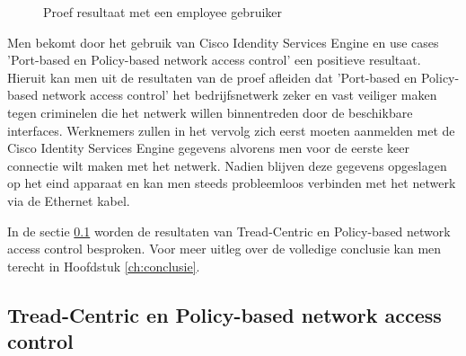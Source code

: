 \begin{figure}[H]
	\centering
	\qquad
	\newline
	\qquad
	\caption{Proef resultaat met een employee gebruiker}%
	\label{fig:Test_gebruiker}%
\end{figure}

Men bekomt door het gebruik van Cisco Idendity Services Engine en use cases 'Port-based en Policy-based network access control' een positieve resultaat. Hieruit kan men uit de resultaten van de proef afleiden dat 'Port-based en Policy-based network access control' het bedrijfsnetwerk zeker en vast veiliger maken tegen criminelen die het netwerk willen binnentreden door de beschikbare interfaces. Werknemers zullen in het vervolg zich eerst moeten aanmelden met de Cisco Identity Services Engine gegevens alvorens men voor de eerste keer connectie wilt maken met het netwerk. Nadien blijven deze gegevens opgeslagen op het eind apparaat en kan men steeds probleemloos verbinden met het netwerk via de Ethernet kabel.

In de sectie \ref{sec:trepo} worden de resultaten van Tread-Centric en Policy-based network access control besproken. Voor meer uitleg over de volledige conclusie kan men terecht in Hoofdstuk \ref{ch:conclusie}.


\subsection{Tread-Centric en Policy-based network access control}
\label{sec:trepo}

